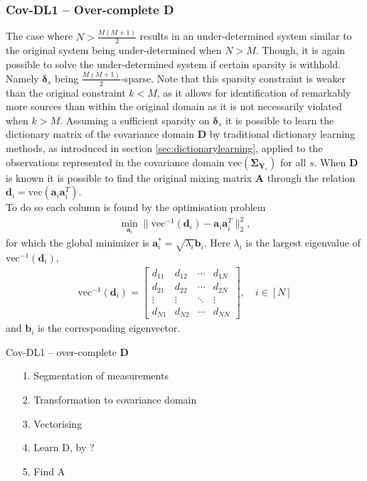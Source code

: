\subsubsection*{Cov-DL1 -- Over-complete \textbf{D}}
The case where $N > \frac{M(M+1)}{2}$ results in an under-determined system similar to the original system being under-determined when $N>M$. 
Though, it is again possible to solve the under-determined system if certain sparsity is withhold. Namely $\boldsymbol{\delta}_s$ being $\frac{M(M+1)}{2}$-sparse. Note that this sparsity constraint is  weaker than the original constraint $k < M$, as it allows for identification of remarkably more sources than within the original domain as it is not necessarily violated when $k > M$.
Assuming a sufficient sparsity on $\boldsymbol{\delta}_s$ it is possible to learn the dictionary matrix of the covariance domain $\mathbf{D}$ by traditional dictionary learning methods, as introduced in section \ref{sec:dictionarylearning}, applied to the observations represented in the covariance domain $\text{vec}(\boldsymbol{\Sigma}_{\mathbf{Y}_s})$ for all $s$. When $\mathbf{D}$ is known it is possible to find the original mixing matrix $\mathbf{A}$ through the relation $\mathbf{d}_i = \text{vec}(\mathbf{a}_i \mathbf{a}_i^T)$.
\\
To do so each column is found by the optimisation problem 
\begin{align*}
\min_{\textbf{a}_i} \| \text{vec}^{-1}(\textbf{d}_i) -\textbf{a}_i\textbf{a}_i^T\|_2^2, 
\end{align*}
for which the global minimizer is $\mathbf{a}^{\ast}_i=\sqrt{\lambda_i} \textbf{b}_i$. Here $\lambda_i$ is the largest eigenvalue of $\text{vec}^{-1}(\textbf{d}_i)$,
\begin{align*}
\text{vec}^{-1}(\textbf{d}_i) = 
\begin{bmatrix}
d_{11} & d_{12} & \cdots & d_{1N} \\
d_{21} & d_{22} & \cdots & d_{2N} \\
\vdots & \vdots & \ddots & \vdots \\
d_{N1} & d_{N2} & \cdots & d_{NN}
\end{bmatrix}, \quad i \in [N]
\end{align*}
and $\textbf{b}_i$ is the corresponding eigenvector.
  
  
\begin{algorithm}[H]
\caption{Cov-DL1 -- over-complete $\mathbf{D}$}
\begin{itemize}
\item[1.] Segmentation of measurements 
\item[2.] Transformation to covariance domain
\item[3.] Vectorising 
\item[4.] Learn D, by ?
\item[5.] Find A
\end{itemize}
\end{algorithm}


